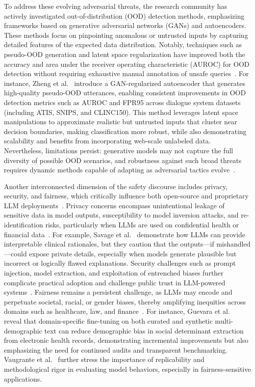 \documentclass[sigconf]{acmart}
\begin{document}
To address these evolving adversarial threats, the research community has actively investigated out-of-distribution (OOD) detection methods, emphasizing frameworks based on generative adversarial networks (GANs) and autoencoders. These methods focus on pinpointing anomalous or untrusted inputs by capturing detailed features of the expected data distribution. Notably, techniques such as pseudo-OOD generation and latent space regularization have improved both the accuracy and area under the receiver operating characteristic (AUROC) for OOD detection without requiring exhaustive manual annotation of unsafe queries~\cite{ref78,ref82}. For instance, Zheng et al.~\cite{ref78} introduce a GAN-regularized autoencoder that generates high-quality pseudo-OOD utterances, enabling consistent improvements in OOD detection metrics such as AUROC and FPR95 across dialogue system datasets (including ATIS, SNIPS, and CLINC150). This method leverages latent space manipulations to approximate realistic but untrusted inputs that cluster near decision boundaries, making classification more robust, while also demonstrating scalability and benefits from incorporating web-scale unlabeled data. Nevertheless, limitations persist: generative models may not capture the full diversity of possible OOD scenarios, and robustness against such broad threats requires dynamic methods capable of adapting as adversarial tactics evolve~\cite{ref78}.

Another interconnected dimension of the safety discourse includes privacy, security, and fairness, which critically influence both open-source and proprietary LLM deployments~\cite{ref1,ref2,ref10,ref22,ref43,ref44,ref49,ref52,ref53,ref65}. Privacy concerns encompass unintentional leakage of sensitive data in model outputs, susceptibility to model inversion attacks, and re-identification risks, particularly when LLMs are used on confidential health or financial data~\cite{ref1,ref10,ref44}. For example, Savage et al.~\cite{ref1} demonstrate how LLMs can provide interpretable clinical rationales, but they caution that the outputs---if mishandled---could expose private details, especially when models generate plausible but incorrect or logically flawed explanations. Security challenges such as prompt injection, model extraction, and exploitation of entrenched biases further complicate practical adoption and challenge public trust in LLM-powered systems~\cite{ref49,ref52,ref53}. Fairness remains a persistent challenge, as LLMs may encode and perpetuate societal, racial, or gender biases, thereby amplifying inequities across domains such as healthcare, law, and finance~\cite{ref2,ref22,ref43,ref65}. For instance, Guevara et al.~\cite{ref2} reveal that domain-specific fine-tuning on both curated and synthetic multi-demographic text can reduce demographic bias in social determinant extraction from electronic health records, demonstrating incremental improvements but also emphasizing the need for continued audits and transparent benchmarking. Vaugrante et al.~\cite{ref22} further stress the importance of replicability and methodological rigor in evaluating model behaviors, especially in fairness-sensitive applications.
\end{document}
